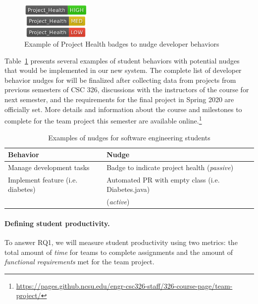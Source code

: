 \begin{figure}[]
\centering
    \includegraphics[width=0.3\textwidth]{images/badges.png}
    \caption{Example of Project Health badges to nudge developer behaviors}    
    \label{fig:badges} 
\end{figure}

Table~\ref{tab:nudges} presents several examples of student behaviors with potential nudges that would be implemented in our new system. The complete list of developer behavior nudges for \TOOL will be finalized after collecting data from projects from previous semesters of CSC 326, discussions with the instructors of the course for next semester, and the requirements for the final project  in Spring 2020 are officially set. More details and information about the course and milestones to complete for the team project this semester are available online.\footnote{\url{https://pages.github.ncsu.edu/engr-csc326-staff/326-course-page/team-project/}}


\begin{table}[H]
\footnotesize
\centering
\begin{tabular}{ ll } \hline
  \textbf{Behavior} & \textbf{Nudge} \\ \hline
 Manage development tasks & Badge to indicate project health (\textit{passive}) \\
 Implement feature (i.e. diabetes) & Automated PR with empty class (i.e. Diabetes.java) \\
 & (\textit{active}) \\
\hline
\end{tabular}
\caption{Examples of nudges for software engineering students}
\label{tab:nudges}
\end{table}

\paragraph{Defining student productivity.}

To answer RQ1, we will measure student productivity using two metrics: the total amount of \textit{time} for teams to complete assignments and the amount of \textit{functional requirements} met for the team project. 

